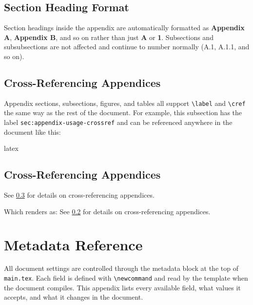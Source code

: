	\subsection{Section Heading Format}
	Section headings inside the appendix are automatically formatted as \textbf{Appendix A}, \textbf{Appendix B}, and so on rather than just \textbf{A} or \textbf{1}. Subsections and subsubsections are not affected and continue to number normally (A.1, A.1.1, and so on).
	
	\subsection{Cross-Referencing Appendices}\label{sec:appendix-usage-crossref}
	Appendix sections, subsections, figures, and tables all support \texttt{\textbackslash label} and \texttt{\textbackslash cref} the same way as the rest of the document. For example, this subsection has the label \texttt{sec:appendix-usage-crossref} and can be referenced anywhere in the document like this:
	
{\vspace{10pt}
	\vspace{-4pt}}
\begin{codelisting}{latex}
	\subsection{Cross-Referencing Appendices}\label{sec:appendix-crossref}
	
	See \cref{sec:appendix-crossref} for details on cross-referencing appendices.
\end{codelisting}
	
	Which renders as: See \cref{sec:appendix-usage-crossref} for details on cross-referencing appendices.

\clearpage
\section{Metadata Reference}

All document settings are controlled through the metadata block at the top of \texttt{main.tex}. Each field is defined with \texttt{\textbackslash newcommand} and read by the template when the document compiles. This appendix lists every available field, what values it accepts, and what it changes in the document.

